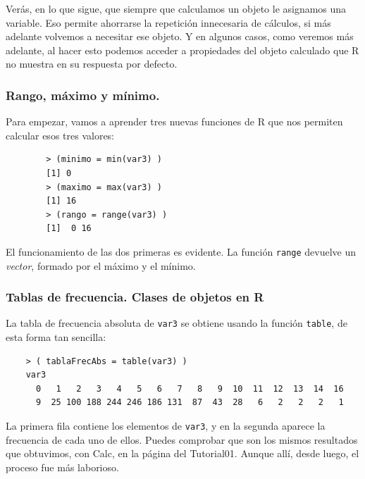 \documentclass[10pt,a4paper]{article}\usepackage[]{graphicx}\usepackage[]{color}
\newcounter {cont01}
\begin{document}
Verás, en lo que sigue, que siempre que calculamos un objeto le asignamos una variable. Eso permite ahorrarse la repetición innecesaria de cálculos, si más adelante volvemos a necesitar ese objeto. Y en algunos casos, como veremos más adelante, al hacer esto podemos acceder a propiedades del objeto calculado que R no muestra en su respuesta por defecto.

\subsubsection*{Rango, máximo y mínimo.}

Para empezar, vamos a aprender tres nuevas funciones de R que nos permiten calcular esos tres valores:

        \begin{verbatim}
        > (minimo = min(var3) )
        [1] 0
        > (maximo = max(var3) )
        [1] 16
        > (rango = range(var3) )
        [1]  0 16
        \end{verbatim}
El funcionamiento de las dos primeras es evidente. La función {\tt range} devuelve un {\em vector}, formado por el máximo y el mínimo.

\subsubsection*{Tablas de frecuencia. Clases de objetos en R}

La tabla de frecuencia absoluta de {\tt var3} se obtiene usando la función {\tt table}, de esta forma tan sencilla:

    \begin{verbatim}
    > ( tablaFrecAbs = table(var3) )
    var3
      0   1   2   3   4   5   6   7   8   9  10  11  12  13  14  16
      9  25 100 188 244 246 186 131  87  43  28   6   2   2   2   1
    \end{verbatim}
La primera fila contiene los elementos de {\tt var3}, y en la segunda aparece la frecuencia de cada uno de ellos. Puedes comprobar que son los mismos resultados que obtuvimos, con Calc, en la página \pageref{tut01-tut01:lugar:TablaFrecuenciasVar3} del Tutorial01. Aunque allí, desde luego, el proceso fue más laborioso.\\
\end{document}

